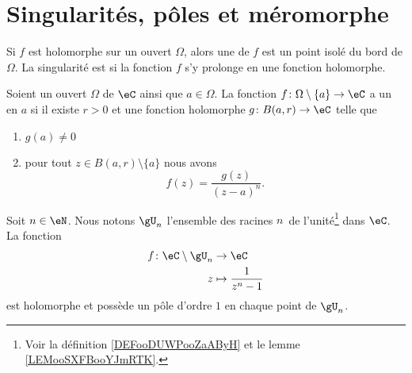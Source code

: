 
\section{Singularités, pôles et méromorphe}

\begin{definition}
    Si \( f\) est holomorphe sur un ouvert \( \Omega\), alors une  de \( f\) est un point isolé du bord de \( \Omega\). La singularité est  si la fonction \( f\) s'y prolonge en une fonction holomorphe.
\end{definition}


\begin{definition}    \label{DEFooUIJTooUJPiDG}
    Soient un ouvert \( \Omega\) de \( \eC\) ainsi que \( a\in \Omega\). La fonction \( f\colon \Omega\setminus\{ a \}\to \eC\) a un  en \( a\) si il existe \( r>0\) et une fonction holomorphe $g\colon B(a,r)\to \eC$ telle que
    \begin{enumerate}
        \item
            \( g(a)\neq 0\)
        \item
            pour tout \( z\in B(a,r)\setminus\{ a \}\) nous avons
            \begin{equation}
                f(z)=\frac{ g(z) }{ (z-a)^n }.
            \end{equation}
    \end{enumerate}
\end{definition}

\begin{lemma}
    Soit \( n\in \eN\). Nous notons \( \gU_n\) l'ensemble des racines \( n\)\ieme\ de l'unité\footnote{Voir la définition \ref{DEFooDUWPooZaAByH} et le lemme \ref{LEMooSXFBooYJmRTK}.} dans \( \eC\). La fonction
    \begin{equation}
        \begin{aligned}
            f\colon \eC\setminus\gU_n&\to \eC \\
            z&\mapsto \frac{1}{ z^n-1 } 
        \end{aligned}
    \end{equation}
    est holomorphe et possède un pôle d'ordre \( 1\) en chaque point de \( \gU_n\).
\end{lemma}

